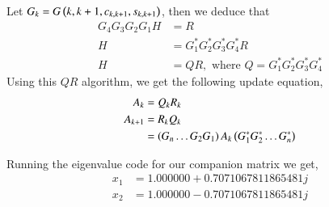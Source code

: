 \documentclass[journal]{IEEEtran}
\begin{document}
Let $G_k = G\left(k, k + 1, c_{k, k+1}, s_{k, k+1}\right)$, then we deduce that
\begin{align}
    G_4 G_3 G_2 G_1 H &= R\\
    H &= G_1^{\ast} G_2^{\ast} G_3^{\ast} G_4^{\ast} R\\
    H &= QR, \text{ where } Q = G_1^{\ast} G_2^{\ast} G_3^{\ast} G_4^{\ast}
\end{align}
Using this $QR$ algorithm, we get the following update equation,
\begin{align}
  A_{k} &= Q_{k}R_{k}\\
  A_{k + 1} &= R_{k}Q_{k}\\
            &= \left(G_{n}\dots G_{2} G_{1}\right) A_{k} \left(G_1^{\ast} G_2^{\ast} \dots G_n^{\ast}\right)
\end{align}

Running the eigenvalue code for our companion matrix we get,
\begin{align}
    x_1 &= 1.000000 + 0.7071067811865481j\\
    x_2 &= 1.000000 - 0.7071067811865481j
\end{align}

 
 


 
\end{document}
